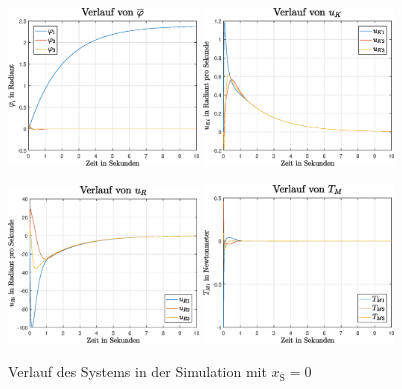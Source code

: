 \begin{figure}[!ht]
\centering
\includegraphics[width=0.45\textwidth]{img/lin_sim1_phi.eps}\hspace{1cm}
\includegraphics[width=0.45\textwidth]{img/lin_sim1_uk.eps}
\end{figure}
\begin{figure}[!ht]\ContinuedFloat
\centering
\includegraphics[width=0.45\textwidth]{img/lin_sim1_ur.eps}\hspace{1cm}
\includegraphics[width=0.45\textwidth]{img/lin_sim1_tm.eps}
\caption{Verlauf des Systems in der Simulation mit $x_{\overline{\text{S}}}=0$}
\end{figure}
